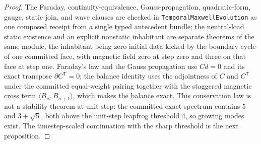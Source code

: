 \documentclass[11pt]{article}
\theoremstyle{remark}
\theoremstyle{plain}
\begin{document}
\begin{proof}
The Faraday, continuity-equivalence, Gauss-propagation, quadratic-form, gauge,
static-join, and wave clauses are checked in
\texttt{TemporalMaxwellEvolution} as one composed receipt from a single
typed antecedent bundle; the neutral-load static existence and an explicit
nonstatic inhabitant are separate theorems of the same module, the
inhabitant being zero initial data kicked by the boundary cycle of one
committed face, with magnetic field zero at step zero and three on that
face at step one. Faraday's law and the Gauss propagation use
\(Cd=0\) and its exact transpose \(\partial C^{\mathsf T}=0\); the balance
identity uses the adjointness of \(C\) and \(C^{\mathsf T}\) under the
committed equal-weight pairing together with the staggered magnetic cross
term \(\langle B_n,B_{n+1}\rangle\), which makes the balance exact. This
conservation law is not a stability theorem at unit step: the committed exact
spectrum contains \(5\) and \(3+\sqrt5\), both above the unit-step leapfrog
threshold \(4\), so growing modes exist. The timestep-scaled continuation
with the sharp threshold is the next proposition.
\end{proof}
\end{document}
